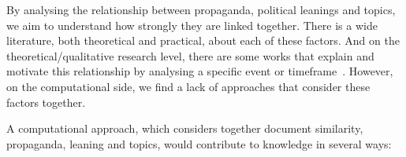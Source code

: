



By analysing the relationship between propaganda, political leanings and topics, we aim to understand how strongly they are linked together.
There is a wide literature, both theoretical and practical, about each of these factors.
And on the theoretical/qualitative research level, there are some works that explain and motivate this relationship by analysing a specific event or timeframe~\citep{pierri2023propaganda,golovchenko2020cross,blumberg1986comparative}.
However, on the computational side, we find a lack of approaches that consider these factors together.

A computational approach, which considers together document similarity, propaganda, leaning and topics, would contribute to knowledge in several ways:


